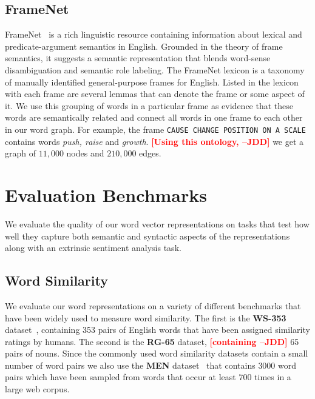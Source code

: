 \documentclass[11pt]{article}
\newcommand{\jdd}[1]{\textcolor{red}{\bf\small [#1 --JDD]}}
\begin{document}
\subsection{FrameNet}
\label{sec:framenet}

FrameNet~\cite{fillmore-ua-2003} is a rich linguistic resource containing  information about
lexical and predicate-argument semantics in English. Grounded in the theory of frame semantics, it suggests 
a semantic representation that blends word-sense disambiguation and semantic role labeling. The FrameNet lexicon
\cite{Baker:1998:BFP:980845.980860} is a taxonomy of manually identified general-purpose frames for English. 
Listed in the lexicon with each frame are several lemmas that can denote the frame or some aspect of it. 
We use this grouping of words in a particular frame as evidence that these words are semantically related and
connect all words in one frame to each other in our word graph. For example, the frame \texttt{CAUSE CHANGE POSITION ON A SCALE} contains words \textit{push, raise} and \textit{growth}. \jdd{Using this ontology,} we get a graph of $11,000$ nodes and $210,000$ edges. 

\section{Evaluation Benchmarks}
\label{sec:eval}

We evaluate the quality of our word vector representations on tasks that
test how well they capture both semantic and syntactic aspects of the representations
along with an extrinsic sentiment analysis task.

\subsection{Word Similarity}
\label{sec:word-sim}

We evaluate our word representations on a variety of different benchmarks that
have been widely used to measure word similarity. The first  is the \textbf{WS-353}
dataset~\cite{citeulike:379845}, containing 353 pairs of English words that have been 
assigned similarity ratings by humans. The second  is the \textbf{RG-65} 
\cite{Rubenstein:1965:CCS:365628.365657} dataset,  \jdd{containing} 65 pairs of nouns. 
Since the commonly used word similarity datasets contain a small number of word pairs we
also use the \textbf{MEN} dataset~\cite{bruni:2012} that contains $3000$ word 
pairs which have been sampled from words
that occur at least $700$ times in a large web corpus. 
\end{document}
